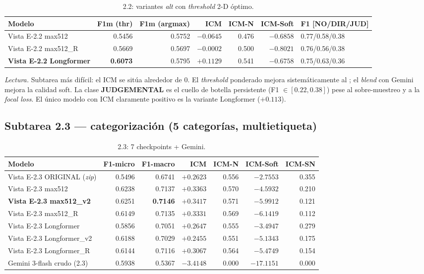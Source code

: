 \documentclass[11pt,a4paper]{article}
\newcommand{\best}[1]{\textbf{#1}}
\newcommand{\code}[1]{\texttt{\detokenize{#1}}}
\begin{document}
\begin{table}[h]\centering\small
\caption{2.2: variantes \emph{alt} con \emph{threshold} 2-D óptimo.}
\setlength\tabcolsep{4pt}
\begin{tabular}{@{}lrrrrrl@{}}
\toprule
Modelo & F1m (thr) & F1m (argmax) & ICM & ICM-N & ICM-Soft & F1 [NO/DIR/JUD] \\
\midrule
Vista E-2.2 max512    & 0.5456 & 0.5752 & $-0.0645$ & 0.476 & $-0.6858$ & 0.77/0.58/0.38 \\
Vista E-2.2 max512\_R & 0.5669 & 0.5697 & $-0.0002$ & 0.500 & $-0.8021$ & 0.76/0.56/0.38 \\
\best{Vista E-2.2 Longformer} & \best{0.6073} & 0.5795 & \best{$+0.1129$} & 0.541 & $-0.6758$ & 0.75/0.63/0.36 \\
\bottomrule
\end{tabular}
\end{table}

\noindent\emph{Lectura.} Subtarea más difícil: el ICM se sitúa alrededor de 0. El \emph{threshold}
ponderado mejora sistemáticamente al \code{argmax}; el \emph{blend} con Gemini mejora la calidad
soft. La clase \textbf{JUDGEMENTAL} es el cuello de botella persistente (F1 $\in[0.22,0.38]$) pese
al sobre-muestreo y a la \emph{focal loss}. El único modelo con ICM claramente positivo es la
variante Longformer ($+0.113$).

\subsection{Subtarea 2.3 --- categorización (5 categorías, multietiqueta)}
\begin{table}[h]\centering\small
\caption{2.3: 7 checkpoints + Gemini.}
\setlength\tabcolsep{5pt}
\begin{tabular}{@{}lrrrrrr@{}}
\toprule
Modelo & F1-micro & F1-macro & ICM & ICM-N & ICM-Soft & ICM-SN \\
\midrule
Vista E-2.3 ORIGINAL (\emph{zip}) & 0.5496 & 0.6741 & $+0.2623$ & 0.556 & $-2.7553$ & 0.355 \\
Vista E-2.3 max512                & 0.6238 & 0.7137 & $+0.3363$ & 0.570 & $-4.5932$ & 0.210 \\
\best{Vista E-2.3 max512\_v2}     & 0.6251 & \best{0.7146} & \best{$+0.3417$} & 0.571 & $-5.9912$ & 0.121 \\
Vista E-2.3 max512\_R             & 0.6149 & 0.7135 & $+0.3331$ & 0.569 & $-6.1419$ & 0.112 \\
Vista E-2.3 Longformer            & 0.5856 & 0.7051 & $+0.2647$ & 0.555 & $-3.4947$ & 0.279 \\
Vista E-2.3 Longformer\_v2        & 0.6188 & 0.7029 & $+0.2455$ & 0.551 & $-5.1343$ & 0.175 \\
Vista E-2.3 Longformer\_R         & 0.6144 & 0.7116 & $+0.3067$ & 0.564 & $-5.4749$ & 0.154 \\
Gemini 3-flash crudo (2.3)        & 0.5938 & 0.5367 & $-3.4148$ & 0.000 & $-17.1151$ & 0.000 \\
\bottomrule
\end{tabular}
\end{table}
\end{document}
